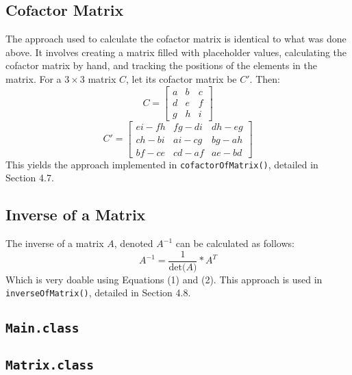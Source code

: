 \documentclass[12pt]{article}
\begin{document}
\subsection{Cofactor Matrix}
The approach used to calculate the cofactor matrix is identical to what was done above. It involves creating a matrix filled with placeholder values, calculating the cofactor matrix by hand, and tracking the positions of the elements in the matrix. For a $3\times3$ matrix $C$, let its cofactor matrix be $C'$. Then:
\[
C =
\begin{bmatrix}
    a & b & c \\
    d & e & f \\
    g & h & i
\end{bmatrix}
\]
\begin{equation}
C' =
    \begin{bmatrix}
    e i - f h & f g - d i & d h - e g \\
    c h - b i & a i - c g & b g - a h \\
    b f - c e & c d - a f & a e - b d
\end{bmatrix}
\end{equation}
This yields the approach implemented in \texttt{cofactorOfMatrix()}, detailed in Section 4.7.

\subsection{Inverse of a Matrix}
The inverse of a matrix $A$, denoted $A^{-1}$ can be calculated as follows:
\begin{equation}
    A^{-1} = \frac{1}{\text{det($A$)}} * A^T
\end{equation}
Which is very doable using Equations (1) and (2). This approach is used in \texttt{inverseOfMatrix()}, detailed in Section 4.8.



\newpage %



\begin{center}
\section{\texttt{Main.class}}
\end{center}



\newpage %



\begin{center}
\section{\texttt{Matrix.class}}
\end{center}
\end{document}
